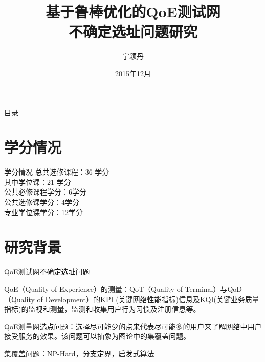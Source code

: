\documentclass[10pt]{beamer}
\title{基于鲁棒优化的QoE测试网\\不确定选址问题研究}
\author{宁颖丹}
\institute{中国科学院大学~数学科学学院\\专业方向：运筹学与控制论\\指导教师：杨文国副教授}
\date{2015年12月}
\begin{document}
\small
\begin{frame}
  \titlepage
\end{frame}

\begin{frame}{目录}
  \tableofcontents
\end{frame}

\section{学分情况}
\begin{frame}{学分情况}
总共选修课程：36 学分\\
其中学位课：21 学分\\
公共必修课程学分：6学分\\
公共选修课学分：4学分 \\
专业学位课学分：12学分

\end{frame}

\section{研究背景}
\begin{frame}{QoE测试网不确定选址问题}

  QoE（Quality of Experience）的测量：QoT（Quality of Terminal）与QoD（Quality of Development）的KPI (关键网络性能指标)信息及KQI(关键业务质量指标)的监视和测量，监测和收集用户行为习惯及注册信息等。

QoE测量网选点问题：选择尽可能少的点来代表尽可能多的用户来了解网络中用户接受服务的效果。该问题可以抽象为图论中的集覆盖问题。

集覆盖问题：NP-Hard，分支定界，启发式算法

\end{frame}
\end{document}
